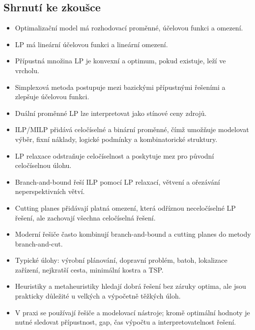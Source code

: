 \subsection{Shrnutí ke zkoušce}

\begin{itemize}
    \item Optimalizační model má rozhodovací proměnné, účelovou funkci a omezení.
    \item LP má lineární účelovou funkci a lineární omezení.
    \item Přípustná množina LP je konvexní a optimum, pokud existuje, leží ve vrcholu.
    \item Simplexová metoda postupuje mezi bazickými přípustnými řešeními a zlepšuje účelovou funkci.
    \item Duální proměnné LP lze interpretovat jako stínové ceny zdrojů.
    \item ILP/MILP přidává celočíselné a binární proměnné, čímž umožňuje modelovat výběr, fixní náklady,
    logické podmínky a kombinatorické struktury.
    \item LP relaxace odstraňuje celočíselnost a poskytuje mez pro původní celočíselnou úlohu.
    \item Branch-and-bound řeší ILP pomocí LP relaxací, větvení a ořezávání neperspektivních větví.
    \item Cutting planes přidávají platná omezení, která odříznou neceločíselné LP řešení, ale zachovají všechna
    celočíselná řešení.
    \item Moderní řešiče často kombinují branch-and-bound a cutting planes do metody branch-and-cut.
    \item Typické úlohy: výrobní plánování, dopravní problém, batoh, lokalizace zařízení, nejkratší cesta,
    minimální kostra a TSP.
    \item Heuristiky a metaheuristiky hledají dobrá řešení bez záruky optima, ale jsou prakticky důležité u velkých
    a výpočetně těžkých úloh.
    \item V praxi se používají řešiče a modelovací nástroje; kromě optimální hodnoty je nutné sledovat
    přípustnost, gap, čas výpočtu a interpretovatelnost řešení.
\end{itemize}

